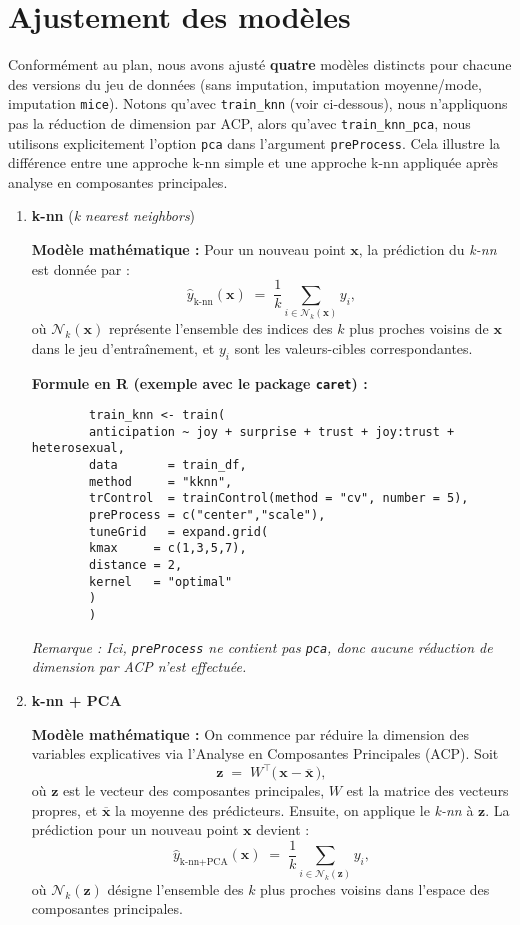 \documentclass[11pt]{article}
\begin{document}
\section{Ajustement des modèles}
Conformément au plan, nous avons ajusté \textbf{quatre} modèles distincts pour chacune des versions du jeu de données (sans imputation, imputation moyenne/mode, imputation \texttt{mice}). 
Notons qu’avec \verb|train_knn| (voir ci-dessous), nous n’appliquons pas la réduction de dimension par ACP, alors qu’avec \verb|train_knn_pca|, nous utilisons explicitement l’option \verb|pca| dans l’argument \verb|preProcess|. Cela illustre la différence entre une approche k-nn simple et une approche k-nn appliquée après analyse en composantes principales.

\begin{enumerate}
	\item \textbf{k-nn} (\emph{k nearest neighbors})
	
	\textbf{Modèle mathématique :}  
	Pour un nouveau point \(\mathbf{x}\), la prédiction du \textit{k-nn} est donnée par :
	\[
	\hat{y}_{\text{k-nn}}(\mathbf{x})
	\;=\;
	\frac{1}{k}\sum_{i \in \mathcal{N}_k(\mathbf{x})} y_i,
	\]
	où \(\mathcal{N}_k(\mathbf{x})\) représente l'ensemble des indices des \(k\) plus proches voisins de \(\mathbf{x}\) dans le jeu d'entraînement, et \(y_i\) sont les valeurs-cibles correspondantes.
	
	\textbf{Formule en R (exemple avec le package \texttt{caret}) :}
	\begin{verbatim}
		train_knn <- train(
		anticipation ~ joy + surprise + trust + joy:trust + heterosexual,
		data       = train_df,
		method     = "kknn",
		trControl  = trainControl(method = "cv", number = 5),
		preProcess = c("center","scale"),
		tuneGrid   = expand.grid(
		kmax     = c(1,3,5,7),
		distance = 2,
		kernel   = "optimal"
		)
		)
	\end{verbatim}
	\emph{Remarque : Ici, \texttt{preProcess} ne contient pas \texttt{pca}, donc aucune réduction de dimension par ACP n’est effectuée.}
	
	\item \textbf{k-nn + PCA}
	
	\textbf{Modèle mathématique :}  
	On commence par réduire la dimension des variables explicatives via l’Analyse en Composantes Principales (ACP). Soit
	\[
	\mathbf{z}
	\;=\;
	W^\top \bigl(\,\mathbf{x} - \overline{\mathbf{x}}\,\bigr),
	\]
	où \(\mathbf{z}\) est le vecteur des composantes principales, \(W\) est la matrice des vecteurs propres, et \(\overline{\mathbf{x}}\) la moyenne des prédicteurs.  
	Ensuite, on applique le \textit{k-nn} à \(\mathbf{z}\). La prédiction pour un nouveau point \(\mathbf{x}\) devient :
	\[
	\hat{y}_{\text{k-nn+PCA}}(\mathbf{x})
	\;=\;
	\frac{1}{k}\sum_{i \in \mathcal{N}_k(\mathbf{z})} y_i,
	\]
	où \(\mathcal{N}_k(\mathbf{z})\) désigne l'ensemble des \(k\) plus proches voisins dans l'espace des composantes principales.
	

\end{enumerate}
\end{document}
